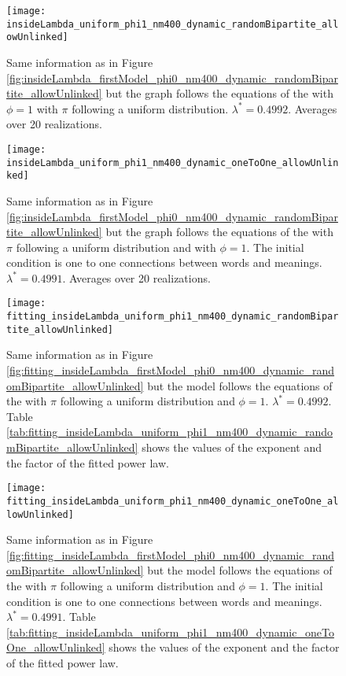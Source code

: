 \begin{figure}
  \centering
  \texttt{[image: insideLambda\_uniform\_phi1\_nm400\_dynamic\_randomBipartite\_allowUnlinked]}
  \caption{Same information as in Figure \ref{fig:insideLambda_firstModel_phi0_nm400_dynamic_randomBipartite_allowUnlinked} but the graph follows the equations of the \secondmodel{} with $\phi=1$ with $\pi$ following a uniform distribution. $\lambda^* = 0.4992$.
  Averages over 20 realizations.}
  \label{fig:insideLambda_uniform_phi1_nm400_dynamic_randomBipartite_allowUnlinked}
\end{figure}

\begin{figure}
  \centering
  \texttt{[image: insideLambda\_uniform\_phi1\_nm400\_dynamic\_oneToOne\_allowUnlinked]}
  \caption{Same information as in Figure \ref{fig:insideLambda_firstModel_phi0_nm400_dynamic_randomBipartite_allowUnlinked} but the graph follows the equations of the \secondmodel{} with $\pi$ following a uniform distribution and with $\phi=1$. The initial condition is one to one connections between words and meanings. $\lambda^* = 0.4991$.
Averages over 20 realizations.}
  \label{fig:insideLambda_uniform_phi1_nm400_dynamic_oneToOne_allowUnlinked}
\end{figure}

\begin{figure}
  \centering
  \texttt{[image: fitting\_insideLambda\_uniform\_phi1\_nm400\_dynamic\_randomBipartite\_allowUnlinked]}
  \caption{Same information as in Figure \ref{fig:fitting_insideLambda_firstModel_phi0_nm400_dynamic_randomBipartite_allowUnlinked} but the model follows the equations of the \secondmodel{} with $\pi$ following a uniform distribution and $\phi=1$. $\lambda^*=0.4992$.
Table \ref{tab:fitting_insideLambda_uniform_phi1_nm400_dynamic_randomBipartite_allowUnlinked} shows the values of the exponent and the factor of the fitted power law.}
  \label{fig:fitting_insideLambda_uniform_phi1_nm400_dynamic_randomBipartite_allowUnlinked}
\end{figure}

\begin{figure}
  \centering
  \texttt{[image: fitting\_insideLambda\_uniform\_phi1\_nm400\_dynamic\_oneToOne\_allowUnlinked]}
  \caption{Same information as in Figure \ref{fig:fitting_insideLambda_firstModel_phi0_nm400_dynamic_randomBipartite_allowUnlinked} but the model follows the equations of the \secondmodel{} with $\pi$ following a uniform distribution and $\phi=1$. The initial condition is one to one connections between words and meanings. $\lambda^*=0.4991$.
Table \ref{tab:fitting_insideLambda_uniform_phi1_nm400_dynamic_oneToOne_allowUnlinked} shows the values of the exponent and the factor of the fitted power law.}
  \label{fig:fitting_insideLambda_uniform_phi1_nm400_dynamic_oneToOne_allowUnlinked}
\end{figure}





